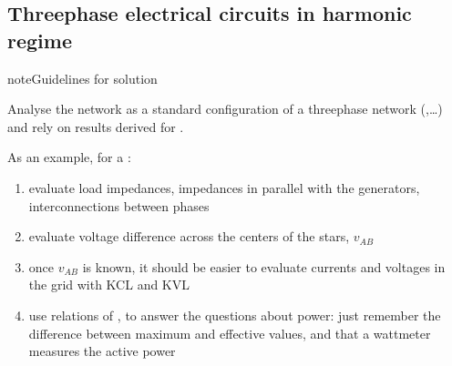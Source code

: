 \documentclass[letterpaper,10pt,english]{jupyterBook}
\begin{document}
\sphinxstepscope


\subsection{Three\sphinxhyphen{}phase electrical circuits in harmonic regime}
\label{\detokenize{ch/electrical-engineering-exercises-three-phase:three-phase-electrical-circuits-in-harmonic-regime}}\label{\detokenize{ch/electrical-engineering-exercises-three-phase:classical-electromagnetism-electrical-engineering-exercises-three-phase}}\label{\detokenize{ch/electrical-engineering-exercises-three-phase::doc}}
\begin{sphinxadmonition}{note}{Guidelines for solution}

\sphinxAtStartPar
Analyse the network as a standard configuration of a three\sphinxhyphen{}phase network ({\hyperref[\detokenize{ch/electrical-engineering-three-phase:classical-electromagnetism-electrical-engineering-three-phase-star-star}]{}},…) and rely on results derived for {\hyperref[\detokenize{ch/electrical-engineering-three-phase:classical-electromagnetism-electrical-engineering-three-phase}]{}}.

\sphinxAtStartPar
As an example, for a :
\begin{enumerate}
%
\item {} 
\sphinxAtStartPar
evaluate load impedances, impedances in parallel with the generators, interconnections between phases

\item {} 
\sphinxAtStartPar
evaluate voltage difference across the centers of the stars, \(v_{AB}\)

\item {} 
\sphinxAtStartPar
once \(v_{AB}\) is known, it should be easier to evaluate currents and voltages in the grid with KCL and KVL

\item {} 
\sphinxAtStartPar
use relations of {\hyperref[\detokenize{ch/electrical-engineering-networks-harmonic:classical-electromagnetism-electrical-engineering-newtork-analysis-harmonic-power}]{}}, to answer the questions about power: just remember the difference between maximum and effective values, and that a wattmeter measures the active power

\end{enumerate}
\end{sphinxadmonition}
 \label{exercise:exam-24-09-06-exe-03}
\end{document}

